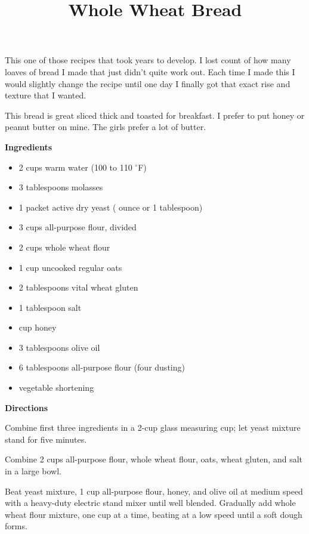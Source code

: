 \documentclass{article}
\title{Whole Wheat Bread}
\begin{document}
This one of those recipes that took years to develop. I lost count of how many
loaves of bread I made that just didn't quite work out. Each time I made this I
would slightly change the recipe until one day I finally got that exact rise
and texture that I wanted.

This bread is great sliced thick and toasted for breakfast. I prefer to put honey
or peanut butter on mine. The girls prefer a lot of butter.

\bigskip

\bigskip

\begin{multicols}{2}
    \textbf{Ingredients}

    \begin{itemize}
        \item 2 cups warm water (100 to 110 $^{\circ}$F)
        \item 3 tablespoons molasses
        \item 1 packet active dry yeast ( ounce or 1 tablespoon)
        \item 3 cups all-purpose flour, divided
        \item 2 cups whole wheat flour
        \item 1 cup uncooked regular oats
        \item 2 tablespoons vital wheat gluten
        \item 1 tablespoon salt
        \item {} cup honey
        \item 3 tablespoons olive oil
        \item 6 tablespoons all-purpose flour (four dusting)
        \item vegetable shortening
    \end{itemize}

    \bigskip

    \textbf{Directions}

    Combine first three ingredients in a 2-cup glass measuring cup; let yeast
    mixture stand for five minutes.
    \medskip

    Combine 2 cups all-purpose flour, whole wheat flour, oats, wheat gluten, and salt in a large bowl.
    \medskip

    Beat yeast mixture, 1 cup all-purpose flour, honey, and olive oil at medium speed with
    a heavy-duty electric stand mixer until well blended. Gradually add whole wheat flour
    mixture, one cup at a time, beating at a low speed until a soft dough forms.
    \medskip


\end{multicols}
\end{document}
